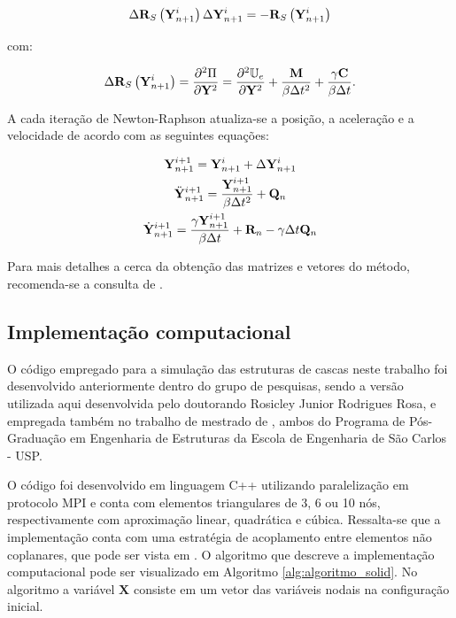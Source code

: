 \begin{gather}
	\Delta\mathbf{R}_S\left(\mathbf{Y}_{n+1}^{i}\right)\Delta\mathbf{Y}_{n+1}^{i} = -\mathbf{R}_S\left(\mathbf{Y}_{n+1}^{i}\right) \label{eq:NR}
\end{gather}

\noindent com:

\begin{gather}
	\Delta\mathbf{R}_S\left(\mathbf{Y}_{n+1}^{i}\right) = \frac{\partial^{2}\Pi}{\partial\mathbf{Y}^{2}} = \frac{\partial^{2}\mathbb{U}_e}{\partial \mathbf{Y}^{2}} + \frac{\mathbf{M}}{\beta \Delta t^2} + \frac{\gamma \mathbf{C}}{\beta \Delta t}.
\end{gather}

A cada iteração de Newton-Raphson atualiza-se a posição, a aceleração e a velocidade de acordo com as seguintes equações:

\begin{gather}
	\mathbf{Y}_{n+1}^{i+1} = \mathbf{Y}_{n+1}^{i} + \Delta\mathbf{Y}_{n+1}^{i} \label{eq:UD1}\\
	\ddot{\mathbf{Y}}_{n+1}^{i+1} = \frac{\mathbf{Y}_{n+1}^{i+1}}{\beta \Delta t^2} + \mathbf{Q}_n  \label{eq:UD2} \\
	\dot{\mathbf{Y}}_{n+1}^{i+1} = \frac{\gamma \mathbf{Y}_{n+1}^{i+1}}{\beta \Delta t} + \mathbf{R}_n - \gamma\Delta t \mathbf{Q}_n  \label{eq:UD3}
\end{gather}

Para mais detalhes a cerca da obtenção das matrizes e vetores do método, recomenda-se a consulta de .

\subsection{Implementação computacional}

O código empregado para a simulação das estruturas de cascas neste trabalho foi desenvolvido anteriormente dentro do grupo de pesquisas, sendo a versão utilizada aqui desenvolvida pelo doutorando Rosicley Junior Rodrigues Rosa, e empregada também no trabalho de mestrado de , ambos do Programa de Pós-Graduação em Engenharia de Estruturas da Escola de Engenharia de São Carlos - USP. 

O código foi desenvolvido em linguagem C++ utilizando paralelização em protocolo MPI e conta com elementos triangulares de 3, 6 ou 10 nós, respectivamente com aproximação linear, quadrática e cúbica. Ressalta-se que a implementação conta com uma estratégia de acoplamento entre elementos não coplanares, que pode ser vista em . O algoritmo que descreve a implementação computacional pode ser visualizado em Algoritmo \ref{alg:algoritmo_solid}. No algoritmo a variável $\mathbf{X}$ consiste em um vetor das variáveis nodais na configuração inicial.

